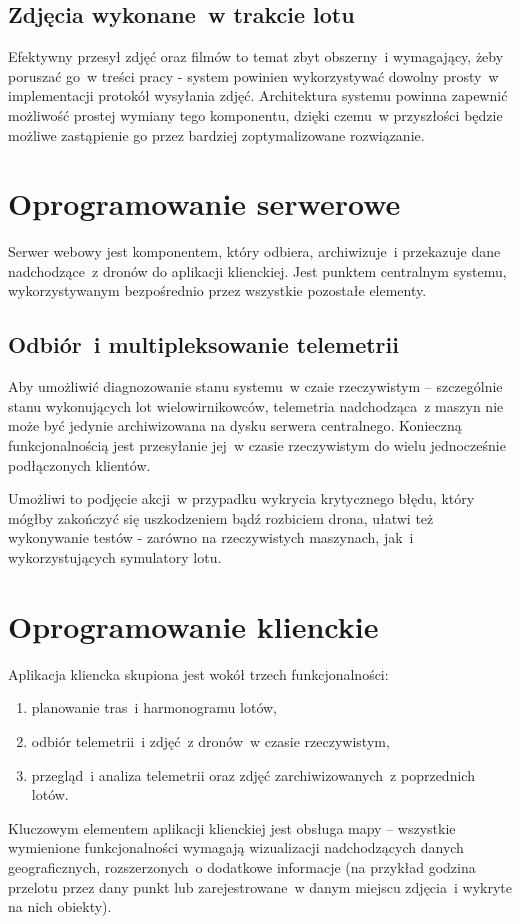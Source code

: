 \subsection{Zdjęcia wykonane~w trakcie lotu}
Efektywny przesył zdjęć oraz filmów to temat zbyt obszerny~i
wymagający, żeby poruszać go~w treści pracy - system
powinien wykorzystywać dowolny prosty~w implementacji
protokół wysyłania zdjęć. Architektura systemu powinna
zapewnić możliwość prostej wymiany tego komponentu, dzięki
czemu~w przyszłości będzie możliwe zastąpienie go
przez bardziej zoptymalizowane rozwiązanie.

\section{Oprogramowanie serwerowe}

Serwer webowy jest komponentem, który odbiera, archiwizuje~i przekazuje
dane nadchodzące~z dronów do aplikacji klienckiej. Jest punktem centralnym systemu,
wykorzystywanym bezpośrednio przez wszystkie pozostałe elementy.

\subsection{Odbiór~i multipleksowanie telemetrii}

Aby umożliwić diagnozowanie stanu systemu~w czaie rzeczywistym -- szczególnie
stanu wykonujących lot wielowirnikowców, telemetria nadchodząca~z maszyn nie może być
jedynie archiwizowana na dysku serwera centralnego. Konieczną funkcjonalnością jest
przesyłanie jej~w czasie rzeczywistym do wielu jednocześnie podłączonych klientów.

Umożliwi to podjęcie akcji~w przypadku wykrycia krytycznego błędu, który mógłby
zakończyć się uszkodzeniem bądź rozbiciem drona, ułatwi też wykonywanie testów - zarówno
na rzeczywistych maszynach, jak~i wykorzystujących symulatory lotu.

\section{Oprogramowanie klienckie}

Aplikacja kliencka skupiona jest wokół trzech funkcjonalności:

\begin{enumerate}
    \item planowanie tras~i harmonogramu lotów,
    \item odbiór telemetrii~i zdjęć~z dronów~w czasie rzeczywistym,
    \item przegląd~i analiza telemetrii oraz zdjęć zarchiwizowanych~z poprzednich lotów.
\end{enumerate}

Kluczowym elementem aplikacji klienckiej jest obsługa mapy -- wszystkie
wymienione funkcjonalności wymagają wizualizacji nadchodzących danych geograficznych,
rozszerzonych~o dodatkowe informacje (na przykład godzina przelotu przez dany punkt lub
zarejestrowane~w danym miejscu zdjęcia~i wykryte na nich obiekty).